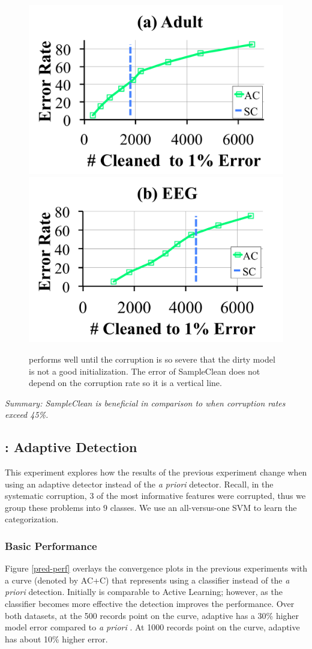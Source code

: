 \begin{figure}[t]
\centering
 \includegraphics[width=0.49\columnwidth]{exp/exp9a.pdf}
  \includegraphics[width=0.49\columnwidth]{exp/exp9b.pdf}\vspace{-1em}
 \caption{\sys performs well until the corruption is so severe that the dirty model is not a good initialization. The error of SampleClean does not depend on the corruption rate so it is a vertical line.  \label{bias}}\vspace{-1.5em}
\end{figure}

\vspace{0.25em}

\noindent \emph{Summary: SampleClean is beneficial in comparison to \sys when corruption rates exceed 45\%.}

\subsection{\sys: Adaptive Detection}
This experiment explores how the results of the previous experiment change when using an adaptive detector instead of the \emph{a priori} detector.
Recall, in the systematic corruption, 3 of the most informative features were corrupted, thus we group these problems into $9$ classes.
We use an all-versus-one SVM to learn the categorization.

\subsubsection{Basic Performance}
Figure \ref{pred-perf} overlays the convergence plots in the previous experiments with a curve (denoted by AC+C) that represents \sys using a classifier instead of the \emph{a priori} detection. Initially \sys is comparable to Active Learning; however, as the classifier becomes more effective the detection improves the performance.
Over both datasets, at the 500 records point on the curve, adaptive \sys has a 30\% higher model error compared to \emph{a priori} \sys.
At 1000 records point on the curve, adaptive \sys has about 10\% higher error.

